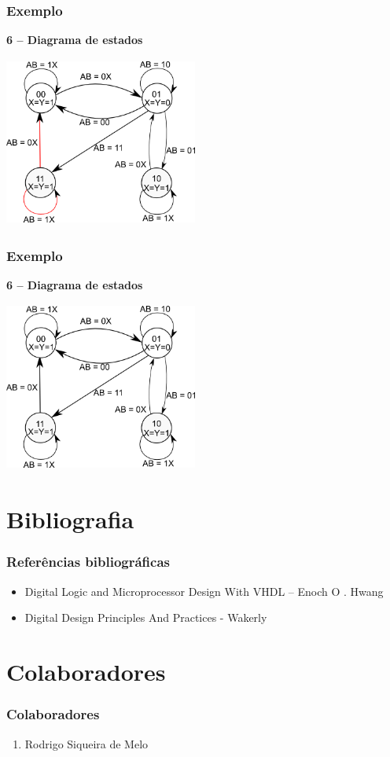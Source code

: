 \documentclass{beamer}
\begin{document}
\begin{frame}
  \frametitle{Exemplo}
  \textbf{6 – Diagrama de estados}
  \begin{center}
   \includegraphics[height = 2.2in, width = 2.5in]{Diagrama_de_estado_ex6.png}
  \end{center}
\end{frame}

\begin{frame}
  \frametitle{Exemplo}
  \textbf{6 – Diagrama de estados}
  \begin{center}
   \includegraphics[height = 2.2in, width = 2.5in]{Diagrama_de_estado_ex7.png}
  \end{center}
\end{frame}

\section{Bibliografia}
\begin{frame}
 \frametitle{Referências bibliográficas}
 \begin{itemize}
  \item Digital Logic and Microprocessor Design With VHDL – Enoch O . Hwang
  \item Digital Design Principles And Practices - Wakerly
 \end{itemize}
\end{frame}

\section{Colaboradores}
\begin{frame}
 \frametitle{Colaboradores}
 \begin{enumerate}
  \item Rodrigo Siqueira de Melo
 \end{enumerate}
\end{frame}
\end{document}
